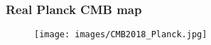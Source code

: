\begin{frame}
\frametitle{Real Planck CMB map}

\begin{figure}
	\texttt{[image: images/CMB2018\_Planck.jpg]}
\end{figure}

\end{frame}

